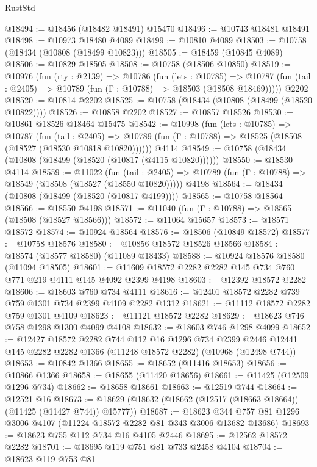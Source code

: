 \begin{lexlean}{RustStd}
\begin{coremodule}
@18494 := @18456 (@18482 @18491) @15470
@18496 := @10743 @18481 @18491
@18498 := @10973 @18480 @4089
@18499 := @10810 @4089
@18503 := @10758 (@18434 (@10808 (@18499 @10823)))
@18505 := @18459 (@10845 @4089)
@18506 := @10829 @18505
@18508 := @10758 (@18506 @10850)
@18519 := @10976
    (fun (rty : @2139) =>
    @10786
      (fun (lets : @10785) =>
      @10787 (fun (tail : @2405) => @10789 (fun (Γ : @10788) => @18503 (@18508 @18469)))))
    @2202
@18520 := @10814 @2202
@18525 := @10758 (@18434 (@10808 (@18499 (@18520 @10822))))
@18526 := @10858 @2202
@18527 := @10857 @18526
@18530 := @10861 @18526 @18464 @15475
@18542 := @10998
    (fun (lets : @10785) =>
    @10787
      (fun (tail : @2405) =>
      @10789 (fun (Γ : @10788) => @18525 (@18508 (@18527 (@18530 @10818 @10820))))))
    @4114
@18549 := @10758 (@18434 (@10808 (@18499 (@18520 (@10817 (@4115 @10820))))))
@18550 := @18530 @4114
@18559 := @11022
    (fun (tail : @2405) => @10789 (fun (Γ : @10788) => @18549 (@18508 (@18527 (@18550 @10820)))))
    @4198
@18564 := @18434 (@10808 (@18499 (@18520 (@10817 @4199))))
@18565 := @10758 @18564
@18566 := @18550 @4198
@18571 := @11040 (fun (Γ : @10788) => @18565 (@18508 (@18527 @18566)))
@18572 := @11064 @15657
@18573 := @18571 @18572
@18574 := @10924 @18564
@18576 := @18506 (@10849 @18572)
@18577 := @10758 @18576
@18580 := @10856 @18572 @18526 @18566
@18584 := @18574 (@18577 @18580) (@11089 @18433)
@18588 := @10924 @18576 @18580 (@11094 @18505)
@18601 := @11609 @18572 @2282 @2282 @145 @734 @760 @771 @219 @4111 @145 @4092 @2399 @4198
@18603 := @12392 @18572 @2282
@18606 := @18603 @760 @734 @4111
@18616 := @12401 @18572 @2282 @739 @759 @1301 @734 @2399 @4109 @2282 @1312
@18621 := @11112 @18572 @2282 @759 @1301 @4109
@18623 := @11121 @18572 @2282
@18629 := @18623 @746 @758 @1298 @1300 @4099 @4108
@18632 := @18603 @746 @1298 @4099
@18652 := @12427
    @18572
    @2282
    @744
    @112
    @16
    @1296
    @734
    @2399
    @2446
    @12441
    @145
    @2282
    @2282
    @1366
    (@11248 @18572 @2282)
    (@10968 (@12498 @744))
@18653 := @10842 @1366
@18655 := @18652 (@11416 @18653)
@18656 := @10866 @1366
@18658 := @18655 (@11420 @18656)
@18661 := @11425 (@12509 @1296 @734)
@18662 := @18658 @18661
@18663 := @12519 @744
@18664 := @12521 @16
@18673 := @18629 (@18632 (@18662 (@12517 (@18663 @18664)) (@11425 (@11427 @744)) @15777))
@18687 := @18623 @344 @757 @81 @1296 @3006 @4107 (@11224 @18572 @2282 @81 @343 @3006 @13682 @13686)
@18693 := @18623 @755 @112 @734 @16 @4105 @2446
@18695 := @12562 @18572 @2282
@18701 := @18695 @119 @751 @81 @733 @2458 @4104
@18704 := @18623 @119 @753 @81

\end{coremodule}
\end{lexlean}

